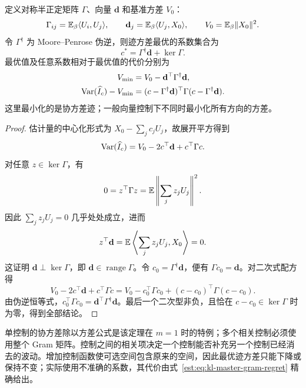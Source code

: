 \begin{theorem}
\label{est:thm:kl-master-gram}
定义对称半正定矩阵 $\Gamma$、向量 $\mathbf d$ 和基准方差 $V_0$：
\begin{equation*}
 \Gamma_{ij}=\mathbb E_\beta\langle U_i,U_j\rangle,\qquad
 \mathbf d_j=\mathbb E_\beta\langle U_j,X_0\rangle,\qquad
 V_0=\mathbb E_\beta\lVert X_0\rVert^2.
\end{equation*}
令 $\Gamma^\dagger$ 为 Moore--Penrose 伪逆，则迹方差最优的系数集合为
\begin{equation*}
 c^*=\Gamma^\dagger\mathbf d+\ker\Gamma.
\end{equation*}
最优值及任意系数相对于最优值的代价分别为
\begin{align}
 V_{\min}&=V_0-\mathbf d^\top\Gamma^\dagger\mathbf d,\\
 \operatorname{Var}(\widehat I_c)-V_{\min}
 &=(c-\Gamma^\dagger\mathbf d)^\top\Gamma(c-\Gamma^\dagger\mathbf d).
 \label{est:eq:kl-master-gram-regret}
\end{align}
这里最小化的是协方差迹；一般向量控制下不同时最小化所有方向的方差。
\end{theorem}

\begin{proof}
估计量的中心化形式为 $X_0-\sum_jc_jU_j$，故展开平方得到
\begin{equation*}
 \operatorname{Var}(\widehat I_c)=V_0-2c^\top\mathbf d+c^\top\Gamma c.
\end{equation*}
对任意 $z\in\ker\Gamma$，有
\begin{equation*}
 0=z^\top\Gamma z=\mathbb E\left\lVert\sum_jz_jU_j\right\rVert^2.
\end{equation*}
因此 $\sum_jz_jU_j=0$ 几乎处处成立，进而
\begin{equation*}
 z^\top\mathbf d=\mathbb E\left\langle\sum_jz_jU_j,X_0\right\rangle=0.
\end{equation*}
这证明 $\mathbf d\perp\ker\Gamma$，即 $\mathbf d\in\operatorname{range}\Gamma$。令 $c_0=\Gamma^\dagger\mathbf d$，便有 $\Gamma c_0=\mathbf d$。对二次式配方得
\begin{equation*}
 V_0-2c^\top\mathbf d+c^\top\Gamma c
 =V_0-c_0^\top\Gamma c_0+(c-c_0)^\top\Gamma(c-c_0).
\end{equation*}
由伪逆恒等式，$c_0^\top\Gamma c_0=\mathbf d^\top\Gamma^\dagger\mathbf d$。最后一个二次型非负，且恰在 $c-c_0\in\ker\Gamma$ 时为零，得到全部结论。
\end{proof}

单控制的协方差除以方差公式是该定理在 $m=1$ 时的特例；多个相关控制必须使用整个 Gram 矩阵。控制之间的相关项决定一个控制能否补充另一个控制已经消去的波动。增加控制函数使可选空间包含原来的空间，因此最优迹方差只能下降或保持不变；实际使用不准确的系数，其代价由式~\eqref{est:eq:kl-master-gram-regret} 精确给出。

